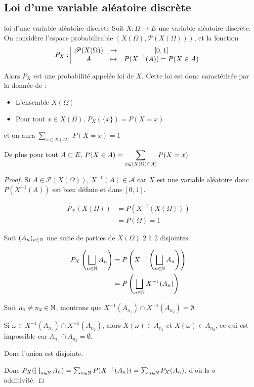 \subsection{Loi d'une variable aléatoire discrète }

\begin{theoreme}{loi d'une variable aléatoire discrète}{}
    Soit $X : \Omega \to E$ une variable aléatoire discrète. On considère l'espace probabilisable 
    $(X(\Omega), \mathscr P(X(\Omega)))$, et la fonction 
    $$P_X: \space \begin{array}{|ccc} \displaystyle \mathscr P(X(\Omega)) & \to & \displaystyle [0, 1] \\ \displaystyle A & \mapsto & \displaystyle P(X^{-1}(A)) = P(X \in A) \end{array}$$

    Alors $P_X$ est une probabilité appelée loi de $X$. Cette loi est donc caractérisée par la donnée de : 
    \begin{itemize}
        \item L'ensemble $X(\Omega)$
        \item Pour tout $x \in X(\Omega)$, $P_X(\{x\}) = P(X = x)$
    \end{itemize}
    et on aura $\sum_{x \in X(\Omega)} P(X = x) = 1$

    De plus pour tout $A \subset E$, $\displaystyle P(X \in A) = \sum_{x \in (X(\Omega) \cap A)} P(X = x)$
\end{theoreme}

\begin{proof}
    Si $A \in \mathscr P(X(\Omega))$, $X^{-1}(A) \in \mathcal A$ car $X$ est une variable aléatoire
    donc $P(X^{-1}(A))$ est bien définie et dans $[0, 1]$.

    \begin{align}
        P_X(X(\Omega)) & = P(X^{-1}(X(\Omega))) \\
        & = P(\Omega) = 1
    \end{align}


    \svspace Soit $(A_n)_{n \in \mathbb{N}}$ une suite de parties de $X(\Omega)$ 2 à 2 disjointes.

    \begin{align}
        P_X \left( \bigsqcup_{n \in \mathbb{N}} A_n \right) & = P\left( X^{-1}\left( \bigsqcup_{n \in \mathbb{N}} A_n \right) \right) \\
        & = P\left( \bigsqcup_{n \in \mathbb{N}} X^{-1}(A_n) \right) 
    \end{align}

    Soit $n_1 \neq n_2 \in \mathbb{N}$, montrons que $X^{-1}(A_{n_1}) \cap X^{-1}(A_{n_2}) = \emptyset$.

    Si $\omega \in X^{-1}(A_{n_1}) \cap X^{-1}(A_{n_2})$, alors $X(\omega) \in A_{n_1}$ et $X(\omega) \in A_{n_2}$,
    ce qui est impossible car $A_{n_1} \cap A_{n_2} = \emptyset$.

    Donc l'union est disjointe. 

    Donc $P_X(\bigsqcup_{n \in \mathbb{N}} A_n) = \sum_{n \in \mathbb{N}} P(X^{-1}(A_n)) = \sum_{n \in \mathbb{N}} P_X(A_n)$, 
    d'où la $\sigma$-additivité.

\end{proof}

